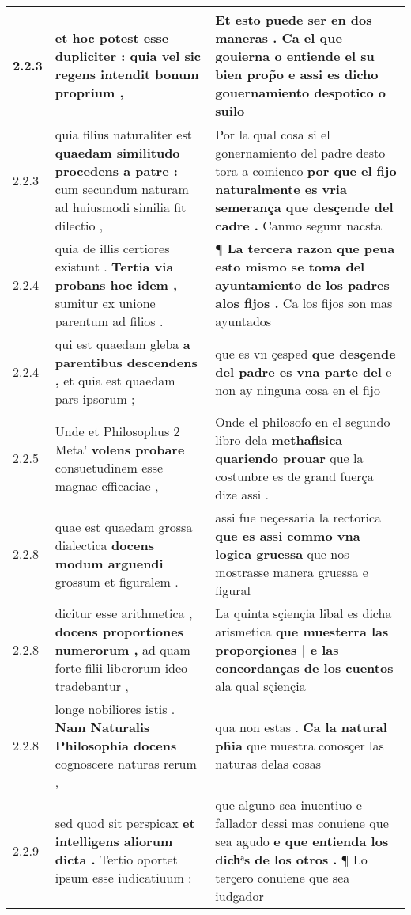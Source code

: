 \begin{tabular}{|p{1cm}|p{6.5cm}|p{6.5cm}|}
2.2.3 & et hoc potest esse dupliciter : \textbf{ quia vel sic regens } intendit bonum proprium , & Et esto puede ser en dos maneras . \textbf{ Ca el que gouierna o entiende el su bien prop̃o } e assi es dicho gouernamiento despotico o suilo \\\hline
2.2.3 & quia filius naturaliter est \textbf{ quaedam similitudo procedens a patre : } cum secundum naturam ad huiusmodi similia fit dilectio , & Por la qual cosa si el gonernamiento del padre desto tora a comienco \textbf{ por que el fijo naturalmente es vria semerança que desçende del cadre . } Canmo segunr nacsta \\\hline
2.2.4 & quia de illis certiores existunt . \textbf{ Tertia via probans hoc idem , } sumitur ex unione parentum ad filios . & ¶ \textbf{ La tercera razon que peua esto mismo se toma del ayuntamiento de los padres alos fijos . } Ca los fijos son mas ayuntados \\\hline
2.2.4 & qui est quaedam gleba \textbf{ a parentibus descendens , } et quia est quaedam pars ipsorum ; & que es vn çesped \textbf{ que desçende del padre es vna parte del } e non ay ninguna cosa en el fijo \\\hline
2.2.5 & Unde et Philosophus 2 Meta’ \textbf{ volens probare } consuetudinem esse magnae efficaciae , & Onde el philosofo en el segundo libro dela \textbf{ methafisica quariendo prouar } que la costunbre es de grand fuerça dize assi . \\\hline
2.2.8 & quae est quaedam grossa dialectica \textbf{ docens modum arguendi } grossum et figuralem . & assi fue neçessaria la rectorica \textbf{ que es assi commo vna logica gruessa } que nos mostrasse manera gruessa e figural \\\hline
2.2.8 & dicitur esse arithmetica , \textbf{ docens proportiones numerorum , } ad quam forte filii liberorum ideo tradebantur , & La quinta sçiençia libal es dicha arismetica \textbf{ que muesterra las proporçiones | e las concordanças de los cuentos } ala qual sçiençia \\\hline
2.2.8 & longe nobiliores istis . \textbf{ Nam Naturalis Philosophia docens } cognoscere naturas rerum , & qua non estas . \textbf{ Ca la natural ph̃ia } que muestra conosçer las naturas delas cosas \\\hline
2.2.9 & sed quod sit perspicax \textbf{ et intelligens aliorum dicta . } Tertio oportet ipsum esse iudicatiuum : & que alguno sea inuentiuo e fallador dessi mas conuiene que sea agudo \textbf{ e que entienda los dichͣs de los otros . } ¶ Lo terçero conuiene que sea iudgador \\\hline

\end{tabular}
